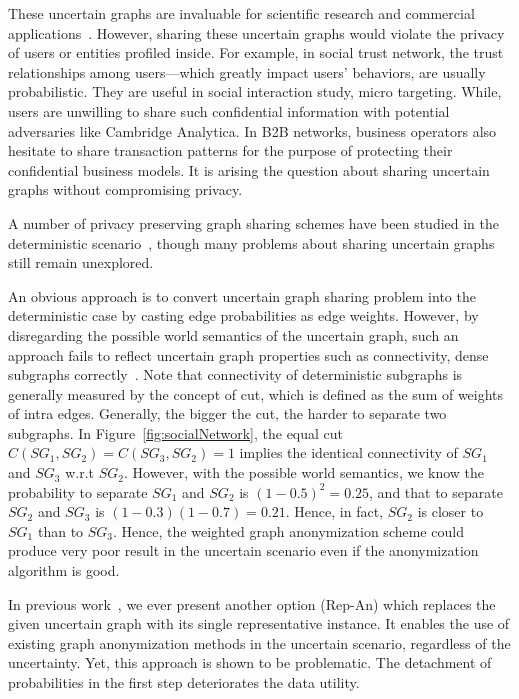 These uncertain graphs are invaluable for scientific research and commercial applications~\cite{Kempe_Maximizing_2003,Cho_Friendship_2011}. However, sharing these uncertain graphs would violate the privacy of users or entities profiled inside. For example, in social trust network, the trust relationships among users---which  greatly impact users' behaviors, are usually probabilistic.  They are useful in social interaction study, micro targeting. While, users are unwilling to share such confidential information with potential adversaries like Cambridge Analytica. In B2B networks, business operators also hesitate to share transaction patterns for the purpose of protecting their confidential business models. It is arising the question about sharing uncertain graphs without compromising privacy. 

A number of privacy preserving graph sharing schemes have been studied in the deterministic scenario~\cite{Liu_Towards_2008,Ying_Randomizing_2008,Wang2011,Liu_Privacy_2009,Nguyen_Anonymizing_2015,Sala_Sharing_2011,Xiao_Differentially_2014,lee2011}, though many problems about sharing uncertain graphs still remain unexplored.

An obvious approach is to convert uncertain graph sharing problem into the deterministic case by casting edge probabilities as edge weights. However, by disregarding the possible world semantics of the uncertain graph, such an approach fails to reflect uncertain graph properties such as connectivity, dense subgraphs correctly~\cite{Zhao_Detecting_2014,Hua_Probabilistic_2010}. {\small Note that connectivity of deterministic subgraphs is generally measured by the concept of cut, which is defined as the sum of weights of intra edges. Generally, the bigger the cut, the harder to separate two subgraphs. In Figure~\ref{fig:socialNetwork}, the equal cut $C(SG_{1},SG_{2})=C(SG_{3},SG_{2})=1$ implies the identical connectivity of $SG_{1}$ and $SG_{3}$ w.r.t $SG_{2}$. However, with the possible world semantics, we know the probability to separate $SG_{1}$ and $SG_{2}$ is $(1-0.5)^{2}=0.25$, and that to separate $SG_{2}$ and $SG_{3}$ is $(1-0.3)(1-0.7)=0.21$. Hence, in fact, $SG_{2}$ is closer to $SG_{1}$ than to $SG_{3}$.} 
Hence, the weighted graph anonymization scheme could produce very poor result in the uncertain scenario even if the anonymization algorithm is good. 


In previous work~\cite{Xiao:2018}, we ever present another option (Rep-An) which replaces the given uncertain graph with its single representative instance. It enables the use of existing graph anonymization methods in the uncertain scenario, regardless of the uncertainty.  Yet, this approach is shown to be problematic. The detachment of probabilities in the first step deteriorates the data utility. 

